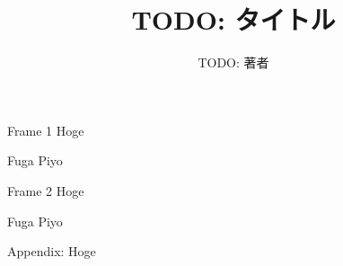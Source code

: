 \documentclass[10pt]{beamer}
\title{TODO: タイトル}
\date{}
\author{TODO: 著者}
\institute{TODO: 所属}
\begin{document}
\maketitle

\begin{frame}{Frame 1}
Hoge
\begin{block}{Fuga}
Piyo
\end{block}
\end{frame}

\begin{frame}{Frame 2}
Hoge
\begin{block}{Fuga}
Piyo
\end{block}
\end{frame}

\appendix

\begin{frame}{Appendix: Hoge}

\end{frame}
\end{document}
